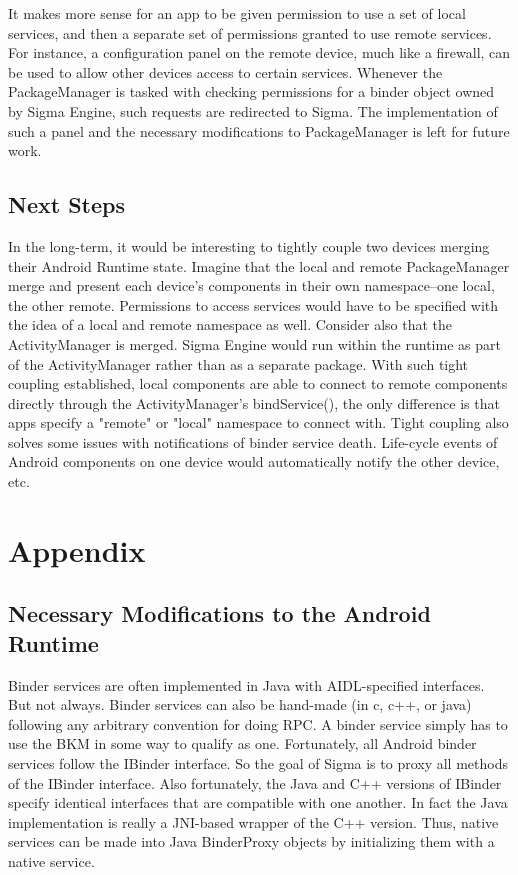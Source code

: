 \documentclass[prodmode]{acmlarge}
\begin{document}
It makes more sense for an app to be given permission to use a set of local services, and then a separate set of permissions granted to use remote services. For instance, a configuration panel on the remote device, much like a firewall, can be used to allow other devices access to certain services. Whenever the PackageManager is tasked with checking permissions for a binder object owned by Sigma Engine, such requests are redirected to Sigma. The implementation of such a panel and the necessary modifications to PackageManager is left for future work.

\subsection{Next Steps}
\label{sec:NextSteps}
In the long-term, it would be interesting to tightly couple two devices merging their Android Runtime state. Imagine that the local and remote PackageManager merge and present each device's components in their own namespace--one local, the other remote. Permissions to access services would have to be specified with the idea of a local and remote namespace as well. Consider also that the ActivityManager is merged. Sigma Engine would run within the runtime as part of the ActivityManager rather than as a separate package. With such tight coupling established, local components are able to connect to remote components directly through the ActivityManager's bindService(), the only difference is that apps specify a "remote" or "local" namespace to connect with. Tight coupling also solves some issues with notifications of binder service death. Life-cycle events of Android components on one device would automatically notify the other device, etc.

\pagebreak[4]
\section{Appendix}

\subsection{Necessary Modifications to the Android Runtime}
\label{sec:AndroidRuntimeModifications}
Binder services are often implemented in Java with AIDL-specified interfaces. But not always. Binder services can also be hand-made (in c, c++, or java) following any arbitrary convention for doing RPC. A binder service simply has to use the BKM in some way to qualify as one. Fortunately, all Android binder services follow the IBinder interface. So the goal of Sigma is to proxy all methods of the IBinder interface. Also fortunately, the Java and C++ versions of IBinder specify identical interfaces that are compatible with one another. In fact the Java implementation is really a JNI-based wrapper of the C++ version. Thus, native services can be made into Java BinderProxy objects by initializing them with a native service.
\end{document}
